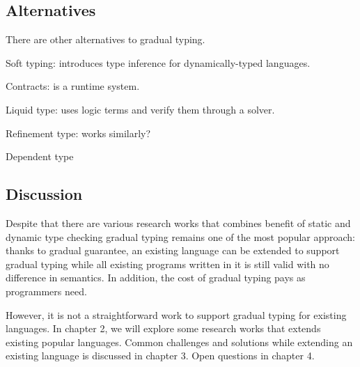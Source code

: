 
\subsection{Alternatives}

There are other alternatives to gradual typing.

Soft typing: introduces type inference for dynamically-typed languages.

Contracts: is a runtime system.

Liquid type: uses logic terms and verify them through a solver.

Refinement type: works similarly?

Dependent type

\subsection{Discussion}

Despite that there are various research works that combines
benefit of static and dynamic type checking
gradual typing remains one of the most popular approach:
thanks to gradual guarantee, an existing language can be extended to
support gradual typing while all existing programs written in it is still valid
with no difference in semantics. In addition, the cost of gradual typing pays
as programmers need.


However, it is not a straightforward work to support gradual typing for existing languages.
In chapter 2, we will explore some research works that extends existing popular languages.
Common challenges and solutions while extending an existing language is discussed in chapter 3.
Open questions in chapter 4.

